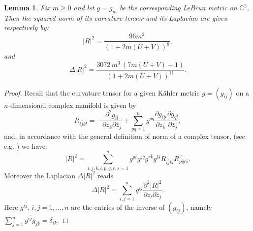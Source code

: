 \documentclass[11pt, reqno]{amsart}
\newtheorem{Alem}[Aprop]{Lemma}
\begin{document}
\begin{Alem}\label{curvature}
Fix $m\geq 0$ and let $g=g_m$ be the corresponding  LeBrun  metric  on ${\mathbb{C}}^2$. Then the squared norm of its curvature tensor and its Laplacian are given respectively by:
\begin{equation}\label{|R|^2}
|R|^2=\frac{96m^2}{(1+2m(U+V))^8},
\end{equation}
and
\begin{equation}\label{L|R|^2}
\Delta|R|^2=\frac{3072\,m^3\,(7m(U+V)-1)}{(1+2m(U+V))^{11}}.
\end{equation}
\end{Alem}
\begin{proof}
Recall that the curvature tensor for a given K\"ahler metric $g=(g_{i\bar j})$ on a $n$-dimensional complex manifold is given by
\begin{equation}\label{curvature2}
R_{i\bar j k\bar l}=-\frac{{\partial}^2 g_{i\bar l}}{{\partial} z_k{\partial}\bar z_j}+\sum_{p q=1}^n g^{p\bar q}\frac{{\partial} g_{i\bar p}}{{\partial} z_k}\frac{{\partial} g_{q\bar l}}{{\partial}\bar z_j},
\end{equation}
and, in accordance with the general definition of norm of a complex tensor,
 (see e.g. \cite[p. 127]{zhe}) we have:
\begin{equation}\label{normcurv}
|R|^2=\sum_{i,j,k,l,p,q,r,s=1}^n {g^{p\bar i}}{g^{j\bar q}}{g^{r\bar k}}{g^{l\bar s}}R_{i\bar j k\bar l}\overline{R_{p\bar q r\bar s}}.
\end{equation}
Moreover the Laplacian $\Delta|R|^2$ reads
\begin{equation}\label{laplaciannormcurv}
\Delta|R|^2=\sum_{i,j=1}^n {g^{i\bar j}}\frac{{\partial}^2 |R|^2}{{\partial} z_i{\partial}\bar z_j}.
\end{equation}
Here $g^{i\bar j}$, $i, j=1, \dots ,n$ are the entries  of the inverse of
$(g_{i\bar j})$, namely $\sum_{j =1}^{n}g^{i\bar
j}g_{j\bar k}=\delta_{ik}$.


\end{proof}
\end{document}
